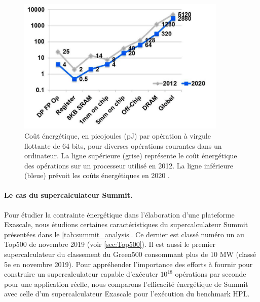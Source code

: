             \begin{figure}
            \center
            \includegraphics[width=10cm]{images/energy_pj.png}
            \caption{\label{fig:energy_pj} Coût énergétique, en picojoules (pJ) par opération à virgule flottante de 64 bits, pour diverses opérations courantes dans un ordinateur. La ligne supérieure (grise) représente le coût énergétique des opérations sur un processeur utilisé en 2012. La ligne inférieure (bleue) prévoit les coûts énergétiques en 2020 \cite{Leland2014}.}
            \end{figure}
            
                

        
        \paragraph{Le cas du supercalculateur Summit.} 
        
            Pour étudier la contrainte énergétique dans l'élaboration d'une plateforme Exascale, nous étudions certaines caractéristiques du supercalculateur Summit présentées dans le \autoref{tab:summit_analysis}. Ce dernier est classé numéro un au Top500 de novembre 2019 (voir \autoref{sec:Top500}). Il est aussi le premier supercalculateur du classement du Green500 consommant plus de 10 MW  (classé 5e en novembre 2019). Pour appréhender l'importance des efforts à fournir pour construire un supercalculateur capable d'exécuter $10^{18}$ opérations par seconde pour une application réelle, nous comparons l'efficacité énergétique de Summit avec celle d'un supercalculateur Exascale pour l'exécution du benchmark HPL.
        
